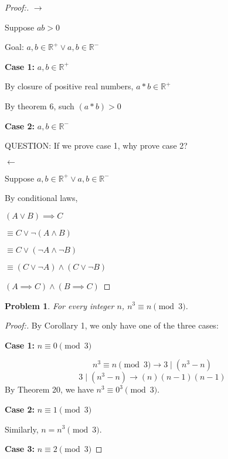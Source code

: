\documentclass[12pt]{article}
\newtheorem{theorem}{Problem}[section]
\begin{document}
\begin{proof}[Proof:]

    \textbf{$\longrightarrow$}

    Suppose $ab > 0$
    
    Goal: $a, b \in \mathbb{R^+} \lor a, b \in \mathbb{R^-}$

    \textbf{Case 1:} $a, b \in \mathbb{R^+}$

    By closure of positive real numbers, $a * b \in \mathbb{R^+}$
    
    By theorem 6, such $(a * b) > 0$

    \textbf{Case 2:} $a, b \in \mathbb{R^-}$
    
    QUESTION: If we prove case 1, why prove case 2? 

    \textbf{$\longleftarrow$}

    Suppose $a, b \in \mathbb{R^+} \lor a, b \in \mathbb{R^-}$

    By conditional laws, 
    
    $(A \lor B) \implies C$ 
    
    $\equiv C \lor \lnot (A \land B)$ 

    $\equiv C \lor (\lnot A \land \lnot B)$
    
    $\equiv (C \lor \lnot A) \land (C \lor \lnot B)$
    
    $(A \implies C) \land (B \implies C)$


\end{proof}

\newpage

\begin{theorem}
For every integer $n$, $n^3 \equiv n \pmod{3}$.
\end{theorem}

\begin{proof}[Proof:]
By Corollary 1, we only have one of the three cases:

\textbf{Case 1:} $n \equiv 0 \pmod{3}$

\[
n^3 \equiv n \pmod{3} \longrightarrow  3 \mid (n^3 - n)
\]
\[
3 \mid (n^3 - n) \longrightarrow (n)(n - 1)(n - 1)
\]
By Theorem 20, we have $n^3 \equiv 0^3 \pmod{3}$.

\textbf{Case 2:} $n \equiv 1 \pmod{3}$

Similarly, $n = n^3 \pmod{3}$.

\textbf{Case 3:} $n \equiv 2 \pmod{3}$

\end{proof}
\end{document}
